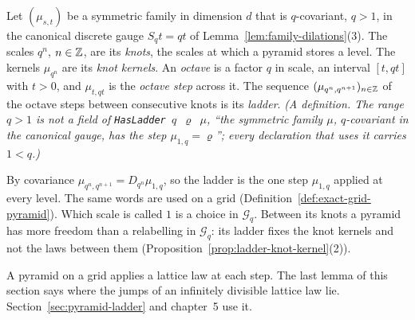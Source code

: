 \begin{definition}
\label{def:knots-and-ladder}
\leanok
{}
Let $(\mu_{s,t})$ be a symmetric family in dimension $d$ that is $q$-covariant, $q > 1$, in the
canonical discrete gauge $S_qt = qt$ of Lemma~\ref{lem:family-dilations}(3). The scales $q^n$,
$n \in \mathbb{Z}$, are its \emph{knots}, the scales at which a pyramid stores a level. The kernels
$\mu_{q^n}$ are its \emph{knot kernels}. An \emph{octave} is a factor $q$ in scale, an interval
$[t, qt]$ with $t > 0$, and $\mu_{t,qt}$ is the \emph{octave step} across it. The sequence
$(\mu_{q^n,q^{n+1}})_{n \in \mathbb{Z}}$ of the octave steps between consecutive knots is its \emph{ladder}.
\statusT\quad\emph{(A definition. The range $q > 1$ is not a field of \texttt{HasLadder $q$ $\varrho$
$\mu$}, ``the symmetric family $\mu$, $q$-covariant in the canonical gauge, has the step
$\mu_{1,q} = \varrho$''; every declaration that uses it carries $1 < q$.)}
\end{definition}

By covariance $\mu_{q^n,q^{n+1}} = D_{q^n}\mu_{1,q}$, so the ladder is the one step $\mu_{1,q}$ applied
at every level. The same words are used on a grid (Definition~\ref{def:exact-grid-pyramid}). Which
scale is called $1$ is a choice in $\mathcal{G}_q$. Between its knots a pyramid has more freedom than
a relabelling in $\mathcal{G}_q$: its ladder fixes the knot kernels and not the laws between them
(Proposition~\ref{prop:ladder-knot-kernel}(2)).

A pyramid on a grid applies a lattice law at each step. The last lemma of this section says where
the jumps of an infinitely divisible lattice law lie. Section~\ref{sec:pyramid-ladder} and
chapter~5 use it.

